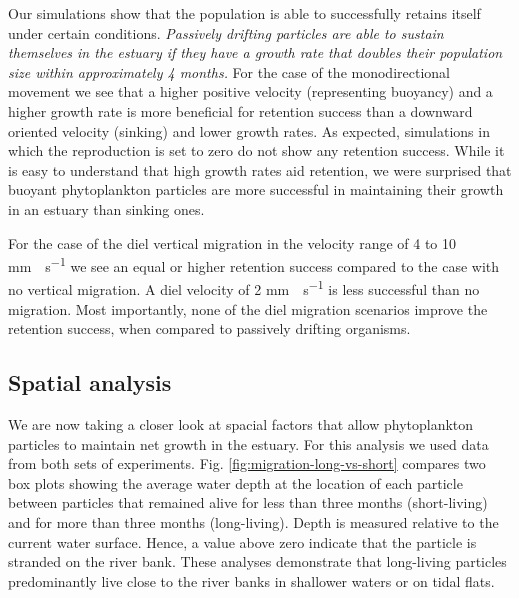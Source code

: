 \documentclass[npg, manuscript]{copernicus}
\begin{document}
Our simulations show that the population is able to successfully retains itself under certain conditions.
\textit{
    Passively drifting particles are able to sustain themselves in the estuary if they have a growth rate that doubles their population size within approximately 4 months.
}
For the case of the monodirectional movement we see that a higher positive velocity (representing buoyancy) and a higher growth rate is more beneficial for retention success than a downward oriented velocity (sinking) and lower growth rates.
As expected, simulations in which the reproduction is set to zero do not show any retention success.
While it is easy to understand that high growth rates aid retention, we were surprised that buoyant phytoplankton particles are more successful in maintaining their growth in an estuary than sinking ones.

For the case of the diel vertical migration in the velocity range of 4 to 10 \unit{mm\;s^{-1}} we see an equal or higher retention success compared to the case with no vertical migration.
A diel velocity of 2 \unit{mm\;s^{-1}} is less successful than no migration.
Most importantly, none of the diel migration scenarios improve the retention success, when compared to passively drifting organisms.


\subsection{Spatial analysis}

We are now taking a closer look at spacial factors that allow phytoplankton particles to maintain net growth in the estuary. 
For this analysis we used data from both sets of experiments.
Fig. \ref{fig:migration-long-vs-short} compares two box plots showing the average water depth at the location of each particle between particles that remained alive for less than three months (short-living) and for more than three months (long-living).
Depth is measured relative to the current water surface.
Hence, a value above zero indicate that the particle is stranded on the river bank.
These analyses demonstrate that long-living particles predominantly live close to the river banks in shallower waters or on tidal flats.
\end{document}
